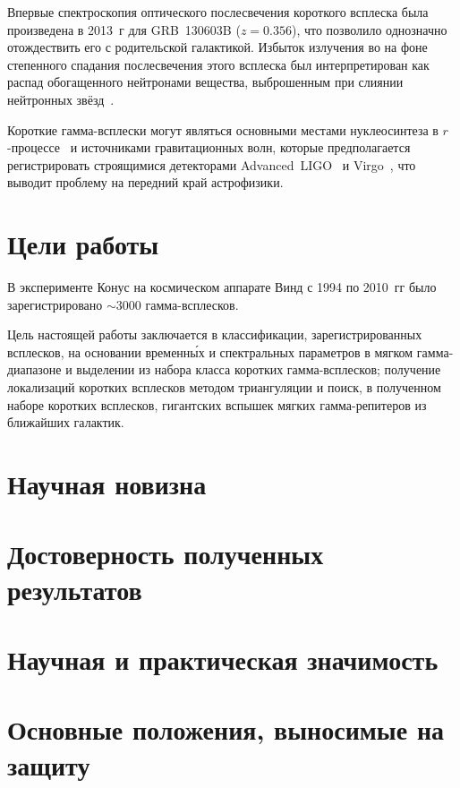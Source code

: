 Впервые спектроскопия оптического послесвечения короткого всплеска была произведена в 2013~г 
для GRB~130603B ($z = 0.356$), что позволило однозначно отождествить его с 
родительской галактикой. Избыток излучения во на фоне степенного спадания 
послесвечения этого всплеска был интерпретирован как распад обогащенного 
нейтронами вещества, выброшенным при слиянии нейтронных звёзд~\citep{Tanvir_2013Natur}. 

Короткие гамма-всплески могут являться основными местами нуклеосинтеза в 
$r$-процессе~\citep{Tanvir_2013Natur} и источниками гравитационных волн, 
которые предполагается регистрировать строящимися детекторами Advanced~LIGO~\citep{Harry_2010CQGra} 
и Virgo~\citep{Accadia_2012JInst}, что выводит проблему на передний край астрофизики.

\section{Цели работы}
В эксперименте Конус на космическом аппарате Винд с 1994 по 2010~гг было 
зарегистрировано $\sim 3000$ гамма-всплесков. 

Цель настоящей работы заключается в классификации, зарегистрированных всплесков, 
на основании временн\'{ы}х и спектральных параметров в мягком гамма-диапазоне 
и выделении из набора класса коротких гамма-всплесков; получение локализаций 
коротких всплесков методом триангуляции и поиск, в полученном наборе коротких всплесков, гигантских 
вспышек мягких гамма-репитеров из ближайших галактик.

\section{Научная новизна}


\section{Достоверность полученных результатов}



\section{Научная и практическая значимость}



\section{Основные положения, выносимые на защиту}

